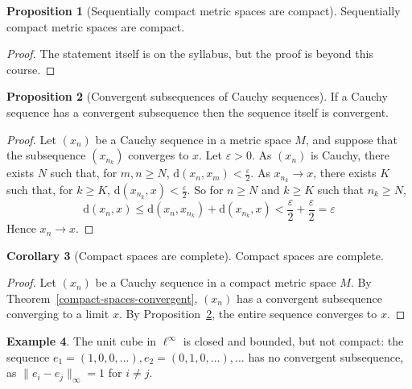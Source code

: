 \documentclass[10pt,fleqn]{article}
\newcommand{\met}{\mathrm{d}}
\newcommand{\eps}{\varepsilon}
\theoremstyle{definition} \newtheorem{defn}{Definition}[section]
\theoremstyle{plain}      \newtheorem{thm}[defn]{Theorem}
\theoremstyle{definition} \newtheorem{prop}[defn]{Proposition}
\theoremstyle{definition} \newtheorem{cor}[defn]{Corollary}
\theoremstyle{definition} \newtheorem{ex}[defn]{Example}
\theoremstyle{definition} \newtheorem{rem}[defn]{Remark}
\begin{document}
\begin{prop}[Sequentially compact metric spaces are compact]
    Sequentially compact metric spaces are compact.
\end{prop}

\begin{proof}
    The statement itself is on the syllabus, but the proof is beyond this course.
\end{proof}

\begin{prop}[Convergent subsequences of Cauchy sequences]\label{convergent-subsequences-cauchy}
    If a Cauchy sequence has a convergent subsequence then the sequence itself is convergent.
\end{prop}

\begin{proof}
    Let $(x_n)$ be a Cauchy sequence in a metric space $M$, and suppose that the subsequence $(x_{n_k})$ converges to $x$.
    Let $\eps>0$.
    As $(x_n)$ is Cauchy, there exists $N$ such that, for $m,n\geq N$, $\met(x_n,x_m)<\frac{\eps}{2}$.
    As $x_{n_k}\to x$, there exists $K$ such that, for $k\geq K$, $\met(x_{n_k},x)<\frac{\eps}{2}$.
    So for $n\geq N$ and $k\geq K$ such that $n_k\geq N$,
    \[
        \met(x_n,x)\leq
        \met(x_n,x_{n_k})+\met(x_{n_k},x)<
        \frac{\eps}{2}+\frac{\eps}{2}=
        \eps
    \]
    Hence $x_n\to x$.
\end{proof}

\begin{cor}[Compact spaces are complete]
    Compact spaces are complete.
\end{cor}

\begin{proof}
    Let $(x_n)$ be a Cauchy sequence in a compact metric space $M$.
    By Theorem~\ref{compact-spaces-convergent}, $(x_n)$ has a convergent subsequence converging to a limit $x$.
    By Proposition~\ref{convergent-subsequences-cauchy}, the entire sequence converges to $x$.
\end{proof}

\begin{ex}
    The unit cube in $\ell^{\infty}$ is closed and bounded, but not compact: the sequence $e_1=(1,0,0,\ldots),e_2=(0,1,0,\ldots),\ldots$ has no convergent subsequence, as $\|e_i-e_j\|_{\infty}=1$ for $i\neq j$.
\end{ex}
\end{document}
